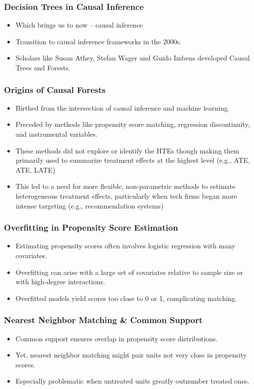 \documentclass{beamer}
\begin{document}
\begin{frame}
\frametitle{Decision Trees in Causal Inference}
\begin{itemize}
	\item Which brings us to now -- causal inference
    \item Transition to causal inference frameworks in the 2000s.
    \item Scholars like Susan Athey, Stefan Wager and Guido Imbens developed Causal Trees and Forests.
\end{itemize}
\end{frame}





\begin{frame}
\frametitle{Origins of Causal Forests}
\begin{itemize}
    \item Birthed from the intersection of causal inference and machine learning.
    \item Preceded by methods like propensity score matching, regression discontinuity, and instrumental variables.
    \item These methods did not explore or identify the HTEs though making them primarily used to summarize treatment effects at the highest level (e.g., ATE, ATE, LATE)
    \item This led to a need for more flexible, non-parametric methods to estimate heterogeneous treatment effects, particularly when tech firms began more intense targeting (e.g., recommendation systems)
\end{itemize}
\end{frame}


\begin{frame}
\frametitle{Overfitting in Propensity Score Estimation}
\begin{itemize}
    \item Estimating propensity scores often involves logistic regression with many covariates.
    \item Overfitting can arise with a large set of covariates relative to sample size or with high-degree interactions.
    \item Overfitted models yield scores too close to 0 or 1, complicating matching.
\end{itemize}
\end{frame}

\begin{frame}
\frametitle{Nearest Neighbor Matching \& Common Support}
\begin{itemize}
    \item Common support ensures overlap in propensity score distributions.
    \item Yet, nearest neighbor matching might pair units not very close in propensity scores.
    \item Especially problematic when untreated units greatly outnumber treated ones.
\end{itemize}
\end{frame}
\end{document}
